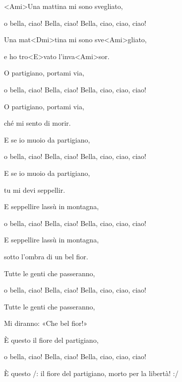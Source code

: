 

\zs
<Ami>Una mattina mi sono svegliato,

o bella, ciao! Bella, ciao! Bella, ciao, ciao, ciao!

Una mat<Dmi>tina mi sono sve<Ami>gliato,

e ho tro<E>vato l'inva<Ami>sor.
\ks

\zs
O partigiano, portami via,

o bella, ciao! Bella, ciao! Bella, ciao, ciao, ciao!

O partigiano, portami via,

ché mi sento di morir.
\ks

\zs
E se io muoio da partigiano,

o bella, ciao! Bella, ciao! Bella, ciao, ciao, ciao!

E se io muoio da partigiano,

tu mi devi seppellir.
\ks

\zs
E seppellire lassù in montagna,

o bella, ciao! Bella, ciao! Bella, ciao, ciao, ciao!

E seppellire lassù in montagna,

sotto l'ombra di un bel fior.
\ks

\zs
Tutte le genti che passeranno,

o bella, ciao! Bella, ciao! Bella, ciao, ciao, ciao!

Tutte le genti che passeranno,

Mi diranno: «Che bel fior!»
\ks

\zs
È questo il fiore del partigiano,

o bella, ciao! Bella, ciao! Bella, ciao, ciao, ciao!

È questo /: il fiore del partigiano, morto per la libertà! :/

\ks

\kp


